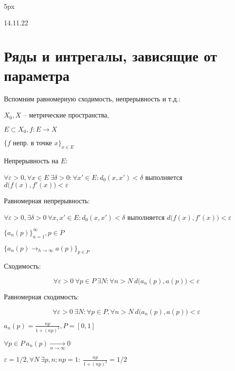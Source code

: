 
\parindent 5px

\usepackage{amsfonts, amssymb, amsmath, mathtools, amsthm}  %
\usepackage{mathrsfs}


\renewcommand{\baselinestretch}{1.3} 


  14.11.22

  \section*{Ряды и интрегалы, зависящие от параметра}

  Вспомним равномерную сходимость, непрерывность и т.д.:

  $X_0, X $ -- метрические пространства,

  $E \subset X_0, f:E\to X$

  $\{ f \text{ непр. в точке }x \}_{x \in E}$

  Непрерывность на $E$: 
  
  $\forall \varepsilon > 0, \forall x \in E \ \exists \delta>0: \forall x' \in E: d_0(x, x') < \delta$ выполняется $d\big(f(x), f'(x)\big) < \varepsilon$

  Равномерная непрерывность:

  $\forall \varepsilon > 0, \exists \delta > 0 \ \forall x, x' \in E: d_0(x, x') < \delta$ выполняется $d\big(f(x), f'(x)\big) < \varepsilon$

  $\{ a_n(p)\}^\infty_{n=1}, p \in P$

  $\{a_n(p) \rightarrow_{h \to \infty} a(p)\}_{p\in P}$

  Сходимость:

  $$\forall \varepsilon > 0 \ \forall p \in P \ \exists N: \forall n > N \ d\big(a_n(p), a(p)\big) < \varepsilon$$

  Равномерная сходимость:

  $$\forall \varepsilon > 0 \ \exists N: \forall p \in P, \forall n > N \ d\big(a_n(p), a(p)\big) < \varepsilon$$

  \begin{illustration}
    
    $a_n(p) = \frac{np}{1 + (np)^2}, P = [0, 1]$
  
    $\forall p \in P \ a_n(p) \underset{n\to \infty}{\longrightarrow} 0$
  
    $\varepsilon = 1/2, \forall N \ \exists p, n; np=1:\ \frac{np}{1+(np)^2} = 1/2$
  \end{illustration}

